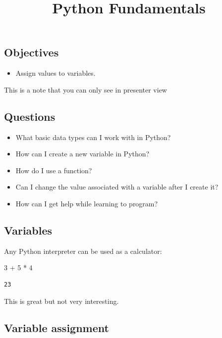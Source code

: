 \documentclass[
  letterpaper,
  DIV=11,
  numbers=noendperiod]{scrartcl}
\title{Python Fundamentals}
\author{}
\date{}
\newenvironment{Shaded}{\begin{snugshade}}{\end{snugshade}}
\newcommand{\DecValTok}[1]{\textcolor[rgb]{0.68,0.00,0.00}{#1}}
\newcommand{\OperatorTok}[1]{\textcolor[rgb]{0.37,0.37,0.37}{#1}}
\providecommand{\tightlist}{%
  \setlength{\itemsep}{0pt}\setlength{\parskip}{0pt}}
\begin{document}
\maketitle


\subsection{Objectives}\label{objectives}

\begin{itemize}
\tightlist
\item
  Assign values to variables.
\end{itemize}

This is a note that you can only see in presenter view

\subsection{Questions}\label{questions}

\begin{itemize}
\item
  What basic data types can I work with in Python?
\item
  How can I create a new variable in Python?
\item
  How do I use a function?
\item
  Can I change the value associated with a variable after I create it?
\item
  How can I get help while learning to program?
\end{itemize}

\subsection{Variables}\label{variables}

Any Python interpreter can be used as a calculator:

\begin{Shaded}
\begin{Highlighting}[]
\DecValTok{3} \OperatorTok{+} \DecValTok{5} \OperatorTok{*} \DecValTok{4}
\end{Highlighting}
\end{Shaded}

\begin{verbatim}
23
\end{verbatim}

This is great but not very interesting.

\subsection{Variable assignment}\label{variable-assignment}
\end{document}
